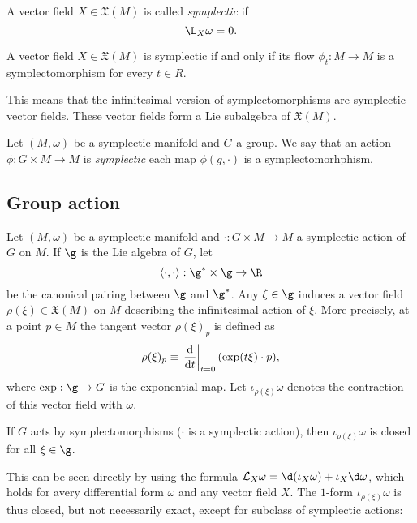 \documentclass{worksheetclass}
\begin{document}
        \begin{defn}
            A vector field $X\in\mathfrak{X}(M)$ is called \emph{symplectic} if
            \begin{equation*}
                \L_X\omega = 0.
            \end{equation*}
        \end{defn}
        \begin{prop}
            A vector field $X\in\mathfrak{X}(M)$ is symplectic if and only if its flow $\phi_t:M\to M$ is a symplectomorphism for every $t\in R$.
        \end{prop}
        This means that the infinitesimal version of symplectomorphisms are symplectic vector fields. These vector fields form a Lie subalgebra of $\mathfrak{X}(M)$.

        \begin{defn}
            Let $(M,\omega)$ be a symplectic manifold and $G$ a group. We say that an action $\phi:G\times M\to M$ is \emph{symplectic} each map $\phi(g,\cdot)$ is a symplectomorhphism.
        \end{defn}

    \subsection{Group action}

        Let $(M,\omega)$ be a symplectic manifold and $\cdot:G\times M\to M$ a symplectic action of $G$ on $M$. If $\g$ is the Lie algebra of $G$, let
        \begin{equation}
            \langle\cdot,\cdot\rangle : \g^*\times\g\to\R
        \end{equation}
        be the canonical pairing between $\g$ and $\g^*$. Any $\xi\in\g$ induces a vector field $\rho(\xi)\in\mathfrak{X}(M)$ on $M$ describing the infinitesimal action of $\xi$. More precisely, at a point $p\in M$ the tangent vector $\rho(\xi)_p$ is defined as
        \begin{equation}
            \rho(\xi)_p\equiv\eval{\dv{}{t}}_{t=0}(\exp(t\xi)\cdot p),
        \end{equation}
        where $\exp:\g\to G$ is the exponential map. Let $\iota_{\rho(\xi)}\omega$ denotes the contraction of this vector field with $\omega$.
        \begin{prop}
            If $G$ acts by symplectomorphisms ($\cdot$ is a symplectic action), then $\iota_{\rho(\xi)}\omega$ is closed for all $\xi\in\g$.
        \end{prop}
        This can be seen directly by using the formula $\mathcal{L}_X\omega=\d(\iota_X\omega)+\iota_X\d\omega$, which holds for avery differential form $\omega$ and any vector field $X$. The $1$-form $\iota_{\rho(\xi)}\omega$ is thus closed, but not necessarily exact, except for subclass of symplectic actions:
\end{document}
